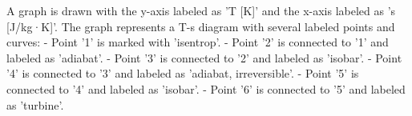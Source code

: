 A graph is drawn with the y-axis labeled as 'T [K]' and the x-axis labeled as 's [J/kg·K]'. The graph represents a T-s diagram with several labeled points and curves:  
- Point '1' is marked with 'isentrop'.  
- Point '2' is connected to '1' and labeled as 'adiabat'.  
- Point '3' is connected to '2' and labeled as 'isobar'.  
- Point '4' is connected to '3' and labeled as 'adiabat, irreversible'.  
- Point '5' is connected to '4' and labeled as 'isobar'.  
- Point '6' is connected to '5' and labeled as 'turbine'.